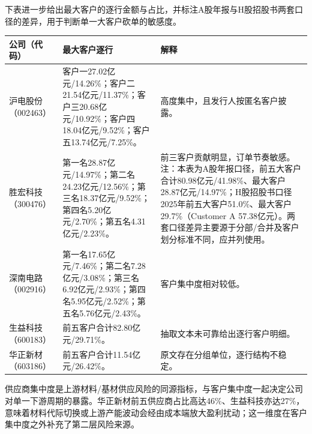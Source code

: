 下表进一步给出最大客户的逐行金额与占比，并标注A股年报与H股招股书两套口径的差异，用于判断单一大客户砍单的敏感度。

\begin{exhibitbox}[图表5-15：年报匿名最大客户明细]
\footnotesize
\begin{tabularx}{\textwidth}{L{1.8cm}X X}
\toprule
\textbf{公司（代码）} & \textbf{最大客户逐行} & \textbf{解释} \\
\midrule
沪电股份（002463） & 客户一27.02亿元/14.26\%；客户二21.54亿元/11.37\%；客户三20.68亿元/10.92\%；客户四18.04亿元/9.52\%；客户五13.74亿元/7.25\%。 & 高度集中，且发行人按匿名客户披露。 \\
胜宏科技（300476） & 第一名28.87亿元/14.97\%；第二名24.23亿元/12.56\%；第三名18.37亿元/9.52\%；第四名5.20亿元/2.70\%；第五名4.31亿元/2.23\%。 & 前三客户贡献明显，订单节奏敏感。注：本表为A股年报口径，前五大客户合计80.98亿元/41.98\%、最大客户28.87亿元/14.97\%；H股招股书口径2025年前五大客户51.0\%、最大客户29.7\%（Customer A 57.38亿元）。两套口径差异主要源于分部/合并及客户划分标准不同，应并列使用。 \\
深南电路（002916） & 第一名17.65亿元/7.46\%；第二名7.28亿元/3.08\%；第三名6.92亿元/2.93\%；第四名5.95亿元/2.52\%；第五名5.76亿元/2.43\%。 & 客户集中度相对较低。 \\
生益科技（600183） & 前五客户合计82.80亿元/29.71\%。 & 抽取文本未可靠给出逐行客户明细。 \\
华正新材（603186） & 前五客户合计11.54亿元/26.42\%。 & 原文存在分组单位，逐行结构不稳定。 \\
\bottomrule
\end{tabularx}
\end{exhibitbox}

供应商集中度是上游材料/基材供应风险的同源指标，与客户集中度一起决定公司对单一下游周期的暴露。华正新材前五供应商占比高达46\%、生益科技亦达27\%，意味着材料代际切换或上游产能波动会经由成本端放大盈利扰动；这一维度在客户集中度之外补充了第二层风险来源。

